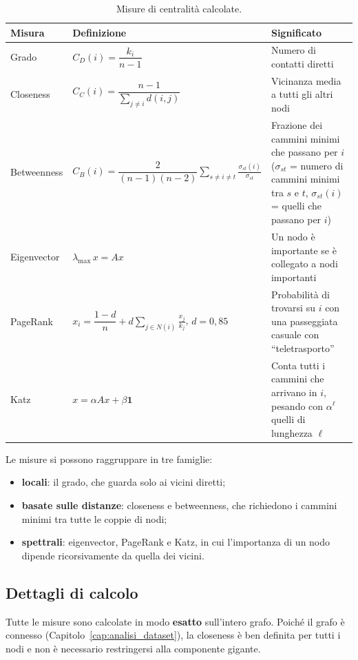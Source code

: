 \documentclass[11pt]{report}
\begin{document}
\begin{table}[H]
  \centering
  \caption{Misure di centralità calcolate.}
  \label{tab:ce_misure}
  \small
  \begin{tabularx}{\textwidth}{@{}l >{\raggedright\arraybackslash}p{5.2cm} >{\raggedright\arraybackslash}X@{}}
    \toprule
    \textbf{Misura} & \textbf{Definizione} & \textbf{Significato} \\
    \midrule
    Grado & $C_D(i)=\dfrac{k_i}{n-1}$ & Numero di contatti diretti \\
    \addlinespace
    Closeness & $C_C(i)=\dfrac{n-1}{\sum_{j\neq i} d(i,j)}$ & Vicinanza media a tutti gli altri nodi \\
    \addlinespace
    Betweenness & $C_B(i)=\dfrac{2}{(n-1)(n-2)}\displaystyle\sum_{s\neq i\neq t}\frac{\sigma_{st}(i)}{\sigma_{st}}$ & Frazione dei cammini minimi che passano per $i$ ($\sigma_{st}$ = numero di cammini minimi tra $s$ e $t$, $\sigma_{st}(i)$ = quelli che passano per $i$) \\
    \addlinespace
    Eigenvector & $\lambda_{\max}\, x = A x$ & Un nodo è importante se è collegato a nodi importanti \\
    \addlinespace
    PageRank & $x_i=\dfrac{1-d}{n}+d\displaystyle\sum_{j\in N(i)}\frac{x_j}{k_j}$, $d=0{,}85$ & Probabilità di trovarsi su $i$ con una passeggiata casuale con ``teletrasporto'' \\
    \addlinespace
    Katz & $x=\alpha A x+\beta\mathbf{1}$ & Conta tutti i cammini che arrivano in $i$, pesando con $\alpha^{\ell}$ quelli di lunghezza $\ell$ \\
    \bottomrule
  \end{tabularx}
\end{table}

Le misure si possono raggruppare in tre famiglie:
\begin{itemize}
  \item \textbf{locali}: il grado, che guarda solo ai vicini diretti;
  \item \textbf{basate sulle distanze}: closeness e betweenness, che richiedono i
        cammini minimi tra tutte le coppie di nodi;
  \item \textbf{spettrali}: eigenvector, PageRank e Katz, in cui l'importanza di
        un nodo dipende ricorsivamente da quella dei vicini.
\end{itemize}

\subsection{Dettagli di calcolo}
Tutte le misure sono calcolate in modo \textbf{esatto} sull'intero grafo. Poiché il
grafo è connesso (Capitolo~\ref{cap:analisi_dataset}), la closeness è ben definita
per tutti i nodi e non è necessario restringersi alla componente gigante.
\end{document}

